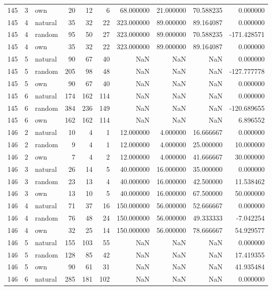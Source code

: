 \begin{table}[htbp]
\begin{tabular}{rrlrrrrrrr}
145 & 3 & own & 20 & 12 & 6 & 68.000000 & 21.000000 & 70.588235 & 0.000000 \\
145 & 4 & natural & 35 & 32 & 22 & 323.000000 & 89.000000 & 89.164087 & 0.000000 \\
145 & 4 & random & 95 & 50 & 27 & 323.000000 & 89.000000 & 70.588235 & -171.428571 \\
145 & 4 & own & 35 & 32 & 22 & 323.000000 & 89.000000 & 89.164087 & 0.000000 \\
145 & 5 & natural & 90 & 67 & 40 & NaN & NaN & NaN & 0.000000 \\
145 & 5 & random & 205 & 98 & 48 & NaN & NaN & NaN & -127.777778 \\
145 & 5 & own & 90 & 67 & 40 & NaN & NaN & NaN & 0.000000 \\
145 & 6 & natural & 174 & 162 & 114 & NaN & NaN & NaN & 0.000000 \\
145 & 6 & random & 384 & 236 & 149 & NaN & NaN & NaN & -120.689655 \\
145 & 6 & own & 162 & 162 & 114 & NaN & NaN & NaN & 6.896552 \\
146 & 2 & natural & 10 & 4 & 1 & 12.000000 & 4.000000 & 16.666667 & 0.000000 \\
146 & 2 & random & 9 & 4 & 1 & 12.000000 & 4.000000 & 25.000000 & 10.000000 \\
146 & 2 & own & 7 & 4 & 2 & 12.000000 & 4.000000 & 41.666667 & 30.000000 \\
146 & 3 & natural & 26 & 14 & 5 & 40.000000 & 16.000000 & 35.000000 & 0.000000 \\
146 & 3 & random & 23 & 13 & 4 & 40.000000 & 16.000000 & 42.500000 & 11.538462 \\
146 & 3 & own & 13 & 10 & 5 & 40.000000 & 16.000000 & 67.500000 & 50.000000 \\
146 & 4 & natural & 71 & 37 & 16 & 150.000000 & 56.000000 & 52.666667 & 0.000000 \\
146 & 4 & random & 76 & 48 & 24 & 150.000000 & 56.000000 & 49.333333 & -7.042254 \\
146 & 4 & own & 32 & 25 & 14 & 150.000000 & 56.000000 & 78.666667 & 54.929577 \\
146 & 5 & natural & 155 & 103 & 55 & NaN & NaN & NaN & 0.000000 \\
146 & 5 & random & 128 & 85 & 42 & NaN & NaN & NaN & 17.419355 \\
146 & 5 & own & 90 & 61 & 31 & NaN & NaN & NaN & 41.935484 \\
146 & 6 & natural & 285 & 181 & 102 & NaN & NaN & NaN & 0.000000 \\

\end{tabular}
\end{table}
